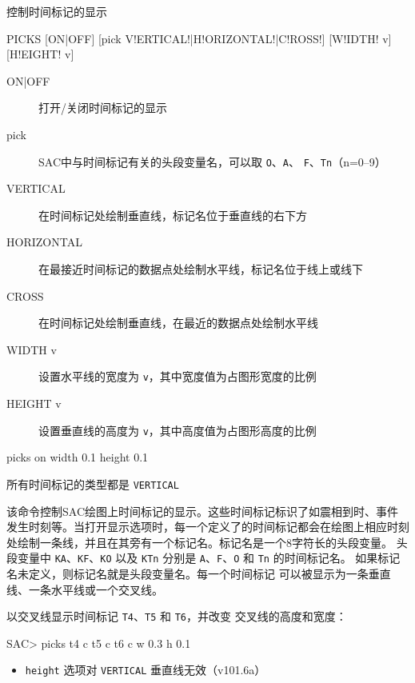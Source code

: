 \label{cmd:picks}

控制时间标记的显示

\begin{SACSTX}
PICKS [ON|OFF] [pick V!ERTICAL!|H!ORIZONTAL!|C!ROSS!] [W!IDTH! v] [H!EIGHT! v]
\end{SACSTX}

\begin{description}
\item [ON|OFF] 打开/关闭时间标记的显示
\item [pick] SAC中与时间标记有关的头段变量名，可以取 \texttt{O}、\texttt{A}、
    \texttt{F}、\texttt{Tn}（n=0--9）
\item [VERTICAL] 在时间标记处绘制垂直线，标记名位于垂直线的右下方
\item [HORIZONTAL] 在最接近时间标记的数据点处绘制水平线，标记名位于线上或线下
\item [CROSS] 在时间标记处绘制垂直线，在最近的数据点处绘制水平线
\item [WIDTH v] 设置水平线的宽度为 \texttt{v}，其中宽度值为占图形宽度的比例
\item [HEIGHT v] 设置垂直线的高度为 \texttt{v}，其中高度值为占图形高度的比例
\end{description}

\begin{SACDFT}
picks on width 0.1 height 0.1
\end{SACDFT}
所有时间标记的类型都是 \texttt{VERTICAL}

该命令控制SAC绘图上时间标记的显示。这些时间标记标识了如震相到时、事件
发生时刻等。当打开显示选项时，每一个定义了的时间标记都会在绘图上相应时刻
处绘制一条线，并且在其旁有一个标记名。标记名是一个8字符长的头段变量。
头段变量中 \texttt{KA}、\texttt{KF}、\texttt{KO} 以及 \texttt{KTn}
分别是 \texttt{A}、\texttt{F}、\texttt{O} 和 \texttt{Tn} 的时间标记名。
如果标记名未定义，则标记名就是头段变量名。每一个时间标记
可以被显示为一条垂直线、一条水平线或一个交叉线。

以交叉线显示时间标记 \texttt{T4}、\texttt{T5} 和 \texttt{T6}，并改变
交叉线的高度和宽度：
\begin{SACCode}
SAC> picks t4 c t5 c t6 c w 0.3 h 0.1
\end{SACCode}

\begin{itemize}
\item \texttt{height} 选项对 \texttt{VERTICAL} 垂直线无效（v101.6a）
\end{itemize}
